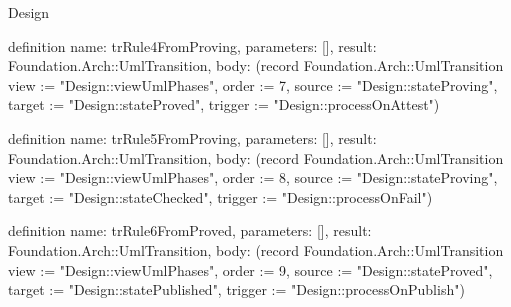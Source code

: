 \begin{lexlean}{Design}
\begin{semanticmodule}
definition{
  name: trRule4FromProving,
  parameters: [],
  result: Foundation.Arch::UmlTransition,
  body: (record Foundation.Arch::UmlTransition {view := "Design::viewUmlPhases", order := 7, source := "Design::stateProving", target := "Design::stateProved", trigger := "Design::processOnAttest"})
}

definition{
  name: trRule5FromProving,
  parameters: [],
  result: Foundation.Arch::UmlTransition,
  body: (record Foundation.Arch::UmlTransition {view := "Design::viewUmlPhases", order := 8, source := "Design::stateProving", target := "Design::stateChecked", trigger := "Design::processOnFail"})
}

definition{
  name: trRule6FromProved,
  parameters: [],
  result: Foundation.Arch::UmlTransition,
  body: (record Foundation.Arch::UmlTransition {view := "Design::viewUmlPhases", order := 9, source := "Design::stateProved", target := "Design::statePublished", trigger := "Design::processOnPublish"})
}
\end{semanticmodule}
\end{lexlean}
